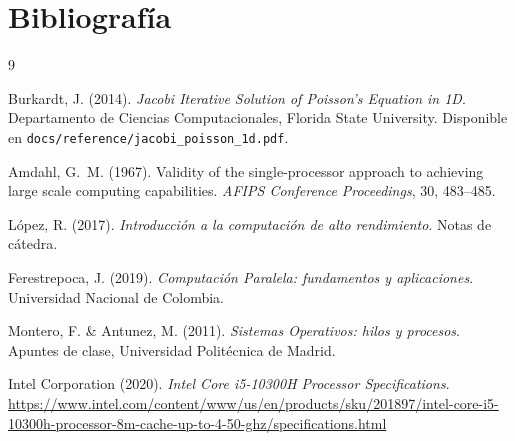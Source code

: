 \documentclass{article}
\begin{document}
\section{Bibliografía}

\begin{thebibliography}{9}

  Burkardt, J. (2014).
  \textit{Jacobi Iterative Solution of Poisson's Equation in 1D}.
  Departamento de Ciencias Computacionales, Florida State University.
  Disponible en \texttt{docs/reference/jacobi\_poisson\_1d.pdf}.

  Amdahl, G.~M. (1967).
  Validity of the single-processor approach to achieving large scale
  computing capabilities.
  \textit{AFIPS Conference Proceedings}, 30, 483--485.

  López, R. (2017).
  \textit{Introducción a la computación de alto rendimiento}.
  Notas de cátedra.

  Ferestrepoca, J. (2019).
  \textit{Computación Paralela: fundamentos y aplicaciones}.
  Universidad Nacional de Colombia.

  Montero, F. \& Antunez, M. (2011).
  \textit{Sistemas Operativos: hilos y procesos}.
  Apuntes de clase, Universidad Politécnica de Madrid.

  Intel Corporation (2020).
  \textit{Intel Core i5-10300H Processor Specifications}.
  \url{https://www.intel.com/content/www/us/en/products/sku/201897/intel-core-i5-10300h-processor-8m-cache-up-to-4-50-ghz/specifications.html}

\end{thebibliography}
\end{document}
